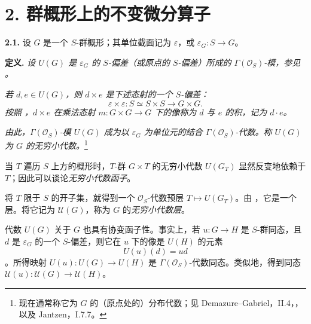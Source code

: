
\section*{2. 群概形上的不变微分算子}
\label{sga3:VIIA:2}

\medskip
\noindent\textbf{2.1.}
\label{sga3:VIIA:2.1}
设 \(G\) 是一个 \(S\)-群概形；其单位截面记为 \(\varepsilon\)，或 \(\varepsilon_G:S\to G\)。

\medskip
\noindent\textbf{定义.}
\textit{设 \(U(G)\) 是 \(\varepsilon_G\) 的 \(S\)-偏差（或原点的 \(S\)-偏差）所成的 \(\Gamma(\mathcal O_S)\)-模，参见 。}

\textit{若 \(d,e\in U(G)\)，则 \(d\times e\) 是下述态射的一个 \(S\)-偏差：
\[
  \varepsilon\times\varepsilon:
  S\simeq S\times S\longrightarrow G\times G.
\]
按照 ，\(d\times e\) 在乘法态射 \(m:G\times G\to G\) 下的像称为 \(d\) 与 \(e\) 的\emph{积}，记为 \(d\cdot e\)。}

\textit{由此，\(\Gamma(\mathcal O_S)\)-模 \(U(G)\) 成为以 \(\varepsilon_G\) 为单位元的结合 \(\Gamma(\mathcal O_S)\)-代数。称 \(U(G)\) 为 \(G\) 的\emph{无穷小代数}。}\footnote{现在通常称它为 \(G\) 的（原点处的）分布代数；见 Demazure--Gabriel，II.4，，以及 Jantzen，I.7.7。}

当 \(T\) 遍历 \(S\) 上方的概形时，\(T\)-群 \(G\times T\) 的无穷小代数 \(U(G_T)\) 显然反变地依赖于 \(T\)；因此可以谈论\emph{无穷小代数函子}。

将 \(T\) 限于 \(S\) 的开子集，就得到一个 \(\mathcal O_S\)-代数预层 \(T\mapsto U(G_T)\)。由 ，它是一个层。将它记为 \(\mathcal U(G)\)，称为 \(G\) 的\emph{无穷小代数层}。

代数 \(U(G)\) 关于 \(G\) 也具有协变函子性。事实上，若 \(u:G\to H\) 是 \(S\)-群同态，且 \(d\) 是 \(\varepsilon_G\) 的一个 \(S\)-偏差，则它在 \(u\) 下的像是 \(U(H)\) 的元素
\[
  U(u)(d)=u d
\]
。所得映射 \(U(u):U(G)\to U(H)\) 是 \(\Gamma(\mathcal O_S)\)-代数同态。类似地，得到同态 \(\mathcal U(u):\mathcal U(G)\to\mathcal U(H)\)。

